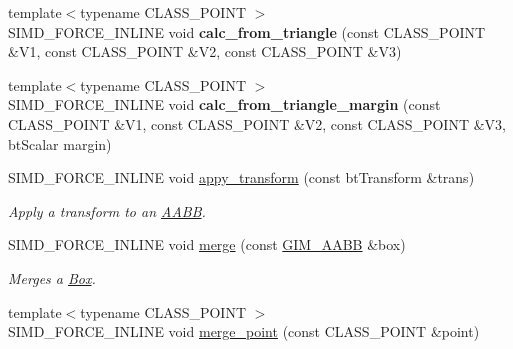 \begin{DoxyCompactItemize}
\mbox{\label{classGIM__AABB_acc278ddfe507da3a10cfe1b575454939}} 
{\footnotesize template$<$typename C\+L\+A\+S\+S\+\_\+\+P\+O\+I\+NT $>$ }\\S\+I\+M\+D\+\_\+\+F\+O\+R\+C\+E\+\_\+\+I\+N\+L\+I\+NE void {\bfseries calc\+\_\+from\+\_\+triangle} (const C\+L\+A\+S\+S\+\_\+\+P\+O\+I\+NT \&V1, const C\+L\+A\+S\+S\+\_\+\+P\+O\+I\+NT \&V2, const C\+L\+A\+S\+S\+\_\+\+P\+O\+I\+NT \&V3)
\item 
\mbox{\label{classGIM__AABB_a01e3fb3fe6955ea31b657fa765c73c7a}} 
{\footnotesize template$<$typename C\+L\+A\+S\+S\+\_\+\+P\+O\+I\+NT $>$ }\\S\+I\+M\+D\+\_\+\+F\+O\+R\+C\+E\+\_\+\+I\+N\+L\+I\+NE void {\bfseries calc\+\_\+from\+\_\+triangle\+\_\+margin} (const C\+L\+A\+S\+S\+\_\+\+P\+O\+I\+NT \&V1, const C\+L\+A\+S\+S\+\_\+\+P\+O\+I\+NT \&V2, const C\+L\+A\+S\+S\+\_\+\+P\+O\+I\+NT \&V3, bt\+Scalar margin)
\item 
\mbox{\label{classGIM__AABB_adeb95bf6a8b4d0281b35adf33fbbfbdc}} 
S\+I\+M\+D\+\_\+\+F\+O\+R\+C\+E\+\_\+\+I\+N\+L\+I\+NE void \hyperlink{classGIM__AABB_adeb95bf6a8b4d0281b35adf33fbbfbdc}{appy\+\_\+transform} (const bt\+Transform \&trans)
\begin{DoxyCompactList}\small\item\em Apply a transform to an \hyperlink{classAABB}{A\+A\+BB}. \end{DoxyCompactList}\item 
\mbox{\label{classGIM__AABB_a75e41aceb9b1e8f4b90e702dcec19c13}} 
S\+I\+M\+D\+\_\+\+F\+O\+R\+C\+E\+\_\+\+I\+N\+L\+I\+NE void \hyperlink{classGIM__AABB_a75e41aceb9b1e8f4b90e702dcec19c13}{merge} (const \hyperlink{classGIM__AABB}{G\+I\+M\+\_\+\+A\+A\+BB} \&box)
\begin{DoxyCompactList}\small\item\em Merges a \hyperlink{classBox}{Box}. \end{DoxyCompactList}\item 
\mbox{\label{classGIM__AABB_a982f35ef44698918555a84419f0bbabf}} 
{\footnotesize template$<$typename C\+L\+A\+S\+S\+\_\+\+P\+O\+I\+NT $>$ }\\S\+I\+M\+D\+\_\+\+F\+O\+R\+C\+E\+\_\+\+I\+N\+L\+I\+NE void \hyperlink{classGIM__AABB_a982f35ef44698918555a84419f0bbabf}{merge\+\_\+point} (const C\+L\+A\+S\+S\+\_\+\+P\+O\+I\+NT \&point)

\end{DoxyCompactItemize}
